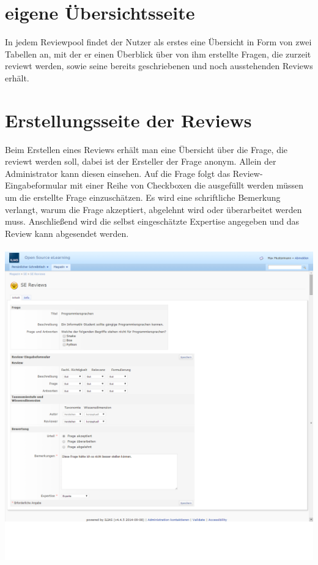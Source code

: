 \documentclass[12pt,a4paper]{scrreprt}
\begin{document}
\section{eigene \"Ubersichtsseite}
In jedem Reviewpool findet der Nutzer als erstes eine Übersicht in Form von zwei Tabellen an, mit der er einen Überblick über von ihm erstellte Fragen, die zurzeit reviewt werden, sowie seine bereits geschriebenen und noch ausstehenden Reviews erhält. 	

\section{Erstellungsseite der Reviews}
Beim Erstellen eines Reviews erhält man eine Übersicht über die Frage, die reviewt werden soll, dabei ist der Ersteller der Frage anonym. Allein der Administrator kann diesen einsehen.
Auf die Frage folgt das Review-Eingabeformular mit einer Reihe von Checkboxen die ausgefüllt werden müssen um die erstellte Frage einzuschätzen. Es wird eine schriftliche Bemerkung verlangt, warum die Frage akzeptiert, abgelehnt wird oder überarbeitet werden muss.
Anschließend wird die selbst eingeschätzte Expertise angegeben und das Review kann abgesendet werden.\\
\\
\includegraphics[width=1.0\textwidth]{reviewformular.png}
\end{document}
